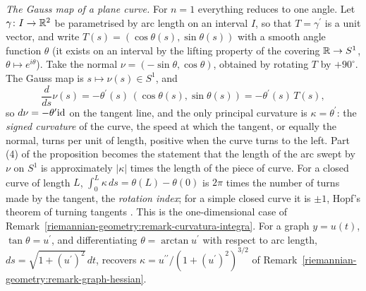 \begin{remark}\label{riemannian-geometry:remark-gauss-map-curves}
\emph{The Gauss map of a plane curve.} For $n = 1$ everything reduces to one angle. Let $\gamma \colon I \to \mathbb{R}^2$ be parametrised by arc length on an interval $I$, so that $T = \gamma^{\prime}$ is a unit
vector, and write $T(s) = (\cos\theta(s), \sin\theta(s))$ with a smooth angle function $\theta$ (it exists on an interval by the lifting property of the covering $\mathbb{R} \to S^1$, $\theta \mapsto e^{i\theta}$). Take
the normal $\nu = (-\sin\theta, \cos\theta)$, obtained by rotating $T$ by $+90^\circ$. The Gauss map is $s \mapsto \nu(s) \in S^1$, and
\[
\frac{d}{ds}\nu(s) = -\theta^{\prime}(s)\,(\cos\theta(s), \sin\theta(s)) = -\theta^{\prime}(s)\,T(s),
\]
so $d\nu = -\theta^{\prime}\mathrm{id}$ on the tangent line, and the only principal curvature is $\kappa = \theta^{\prime}$: the \emph{signed curvature} of the curve, the speed at which the tangent, or equally the normal,
turns per unit of length, positive when the curve turns to the left. Part (4) of the proposition becomes the statement that the length of the arc swept by $\nu$ on $S^1$ is approximately $|\kappa|$ times the
length of the piece of curve. For a closed curve of length $L$, $\int_0^L\kappa\,ds = \theta(L) - \theta(0)$ is $2\pi$ times the number of turns made by the tangent, the \emph{rotation index}; for a simple
closed curve it is $\pm1$, Hopf's theorem of turning tangents \cite{do-carmo-curves-surfaces}. This is the one-dimensional case of Remark~\ref{riemannian-geometry:remark-curvatura-integra}. For a graph $y = u(t)$,
$\tan\theta = u^{\prime}$, and differentiating $\theta = \arctan u^{\prime}$ with respect to arc length, $ds = \sqrt{1 + (u^{\prime})^2}\,dt$, recovers $\kappa = u^{\prime\prime}/(1 + (u^{\prime})^2)^{3/2}$ of
Remark~\ref{riemannian-geometry:remark-graph-hessian}.
\end{remark}

